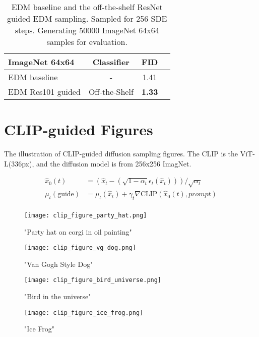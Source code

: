 \documentclass{article}
\theoremstyle{definition}
\begin{document}
\begin{table}[h!]
\caption{EDM baseline and the off-the-shelf ResNet guided EDM sampling. Sampled for 256 SDE steps. Generating 50000 ImageNet 64x64 samples for evaluation.}
\label{table:sde_edm_results}
\begin{center}
\begin{small}
\begin{sc}
\begin{tabular}{lccc}
\toprule
ImageNet 64x64 & Classifier & FID \\ 
\midrule
EDM baseline     & -  & 1.41 \\ 
EDM Res101 guided & Off-the-Shelf & \bf{1.33} \\ 
\bottomrule
\end{tabular}
\end{sc}
\end{small}
\end{center}
\end{table}


\section{CLIP-guided Figures}\label{appendix:clip_figures}
The illustration of CLIP-guided diffusion sampling figures. The CLIP is the ViT-L(336px), and the diffusion model \cite{dhariwal2021diffusion} is from 256x256 ImagNet.

\begin{equation}
\begin{aligned}
\label{eqn:clip_guidance}
\hat{x}_0(t) &= (\hat{x}_t - (\sqrt{1-\alpha_t}\epsilon_t(\hat{x}_t))) / \sqrt{\alpha_t} \\
  \mu_t(\text{guide}) &= \mu_t(\hat{x}_t) + \gamma_t \nabla \text{CLIP}(\hat{x}_0(t),prompt)    \\ 
\end{aligned}
\end{equation}



\begin{figure}[h]\label{fig:clip_all_figures}
  \centering
\texttt{[image: clip\_figure\_party\_hat.png]}
  \caption{"Party hat on corgi in oil painting"}
  \label{fig:clip_figure_party_hat}
\texttt{[image: clip\_figure\_vg\_dog.png]}
  \caption{"Van Gogh Style Dog"}
  \label{fig:clip_figure_vg_dog}
\texttt{[image: clip\_figure\_bird\_universe.png]}
  \caption{"Bird in the universe"}
  \label{fig:clip_figure_bird_universe}
\texttt{[image: clip\_figure\_ice\_frog.png]}
  \caption{"Ice Frog"}
  \label{fig:clip_figure_ice_frog}
\end{figure}
\end{document}
